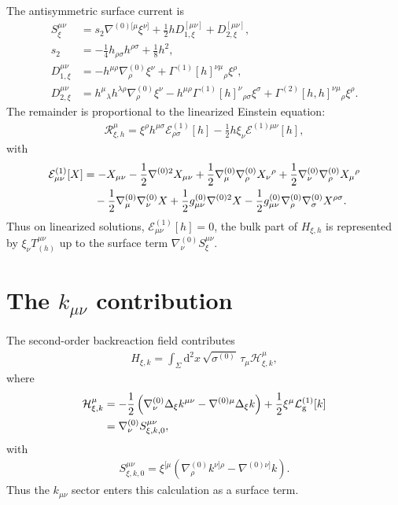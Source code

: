 \documentclass[11pt]{article}
\newcommand{\dd}{\mathrm{d}}
\newcommand{\Lg}{\mathcal{L}_{\mathrm g}}
\newcommand{\cH}{\mathcal{H}}
\newcommand{\cE}{\mathcal{E}}
\newcommand{\cR}{\mathcal{R}}
\begin{document}
The antisymmetric surface current is
\begin{align}
  S_\xi^{\mu\nu}
  &=s_2\nabla^{(0)[\mu}\xi^{\nu]}
    +\frac12hD_{1,\xi}^{[\mu\nu]}
    +D_{2,\xi}^{[\mu\nu]},\\
  s_2
  &=-\frac14h_{\rho\sigma}h^{\rho\sigma}+\frac18h^2,\\
  D_{1,\xi}^{\mu\nu}
  &=-h^{\mu\rho}\nabla^{(0)}_\rho\xi^\nu
    +\Gamma^{(1)}[h]^{\nu\mu}{}_\rho\xi^\rho,\\
  D_{2,\xi}^{\mu\nu}
  &=h^\mu{}_\lambda h^{\lambda\rho}
    \nabla^{(0)}_\rho\xi^\nu
    -h^{\mu\rho}\Gamma^{(1)}[h]^\nu{}_{\rho\sigma}\xi^\sigma
    +\Gamma^{(2)}[h,h]^{\nu\mu}{}_\rho\xi^\rho.
\end{align}
The remainder is proportional to the linearized Einstein equation:
\begin{align}
  \cR^\mu_{\xi,h}
  =\xi^\rho h^{\mu\sigma}\cE^{(1)}_{\rho\sigma}[h]
   -\frac12h\xi_\nu\cE^{(1)\mu\nu}[h],
\end{align}
with
\begin{align}
  \cE_{\mu\nu}^{(1)}[X]
  &=-X_{\mu\nu}
    -\frac12\nabla^{(0)2}X_{\mu\nu}
    +\frac12\nabla^{(0)}_\mu\nabla^{(0)}_\rho X_\nu{}^\rho
    +\frac12\nabla^{(0)}_\nu\nabla^{(0)}_\rho X_\mu{}^\rho
    \notag\\
  &\quad
    -\frac12\nabla^{(0)}_\mu\nabla^{(0)}_\nu X
    +\frac12g^{(0)}_{\mu\nu}\nabla^{(0)2}X
    -\frac12g^{(0)}_{\mu\nu}
      \nabla^{(0)}_\rho\nabla^{(0)}_\sigma X^{\rho\sigma}.
\end{align}
Thus on linearized solutions, $\cE^{(1)}_{\mu\nu}[h]=0$, the bulk part of
$H_{\xi,h}$ is represented by $\xi_\nu T_{(h)}^{\mu\nu}$ up to the surface
term $\nabla^{(0)}_\nu S_\xi^{\mu\nu}$.

\section*{The $k_{\mu\nu}$ contribution}

The second-order backreaction field contributes
\begin{align}
  H_{\xi,k}
  =\int_\Sigma\dd^2x\,\sqrt{\sigma^{(0)}}\,\tau_\mu
    \cH^\mu_{\xi,k},
\end{align}
where
\begin{align}
  \cH^\mu_{\xi,k}
  &=-\frac12\left(
      \nabla^{(0)}_\nu\Delta_\xi k^{\mu\nu}
      -\nabla^{(0)\mu}\Delta_\xi k
    \right)
    +\frac12\xi^\mu\Lg^{(1)}[k] \notag\\
  &=\nabla^{(0)}_\nu S_{\xi,k,0}^{\mu\nu},
\end{align}
with
\begin{align}
  S_{\xi,k,0}^{\mu\nu}
  =\xi^{[\mu}
    \left(
      \nabla^{(0)}_\rho k^{\nu]\rho}
      -\nabla^{(0)\nu]}k
    \right).
\end{align}
Thus the $k_{\mu\nu}$ sector enters this calculation as a surface term.
\end{document}
